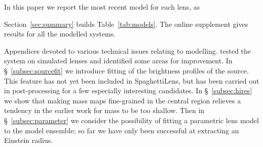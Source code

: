 In this paper we report the most recent model for each lens, as










Section~\ref{sec:summary} builds Table~\ref{tab:models}.
The online supplement gives results for all the modelled systems.

Appendices devoted to various technical issues relating to modelling.
\cite{2015MNRAS.447.2170K} tested the system on simulated lenses and
identified some areas for improvement.
In \S~\ref{subsec:sourcefit} we introduce fitting of the brightness
profiles of the source.  This feature has not yet been included in
SpaghettiLens, but has been carried out in post-processing for a few
especially interesting candidates.  In \S~\ref{subsec:hires} we show
that making mass maps fine-grained in the central region relieves a
tendency in the earlier work for mass to be too shallow. Then in
\S~\ref{subsec:parameter} we consider the possibility of fitting a
parametric lens model to the model ensemble; so far we have only been
successful at extracting an Einstein radius.
